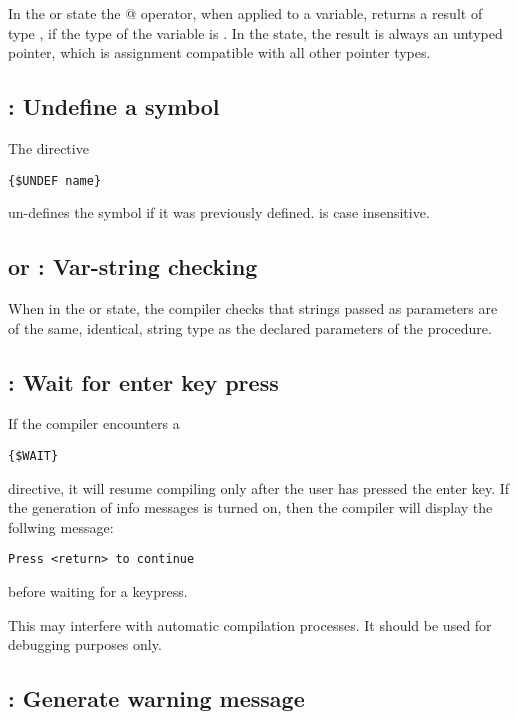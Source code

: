 In the  or  state the @ operator,
when applied to a variable, returns a result of type , if the
type of the variable is . In the  state, the result is
always an untyped pointer, which is assignment compatible with all other
pointer types.

\subsection{ : Undefine a symbol}

The directive
\begin{verbatim}
{$UNDEF name}
\end{verbatim}
un-defines the symbol  if it was previously defined.
 is case insensitive.


\subsection{ or  : Var-string checking}

When in the \var{+} or  state, the compiler checks that strings
passed as parameters are of the same, identical, string type as the declared
parameters of the procedure.

\subsection{ : Wait for enter key press}

If the compiler encounters a
\begin{verbatim}
{$WAIT}
\end{verbatim}
directive, it will resume compiling only after the user has pressed the
enter key. If the generation of info messages is turned on, then the compiler
will display the follwing message:
\begin{verbatim}
Press <return> to continue
\end{verbatim}
before waiting for a keypress.
\begin{remark}This may interfere with automatic
compilation processes. It should be used for debugging purposes only.
\end{remark}

\subsection{ : Generate warning message}

